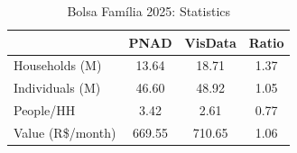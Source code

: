 \begin{table}[htbp]
\centering
\caption{Bolsa Fam\'ilia 2025: Statistics}
\label{tab:bf_size}
\small
\begin{tabular}{lccc}
\toprule
 & PNAD & VisData & Ratio \\
\midrule
Households (M) & 13.64 & 18.71 & 1.37 \\
Individuals (M) & 46.60 & 48.92 & 1.05 \\
People/HH & 3.42 & 2.61 & 0.77 \\
Value (R\$/month) & 669.55 & 710.65 & 1.06 \\
\bottomrule
\end{tabular}
\end{table}
